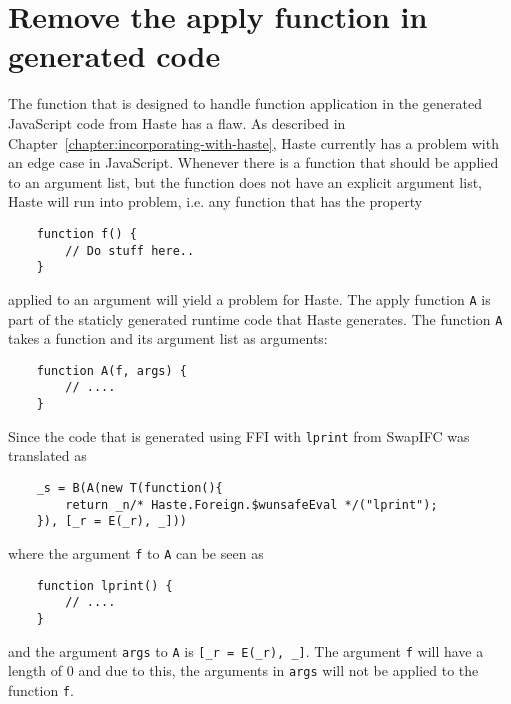 \section{Remove the apply function in generated code}
The function that is designed to handle function application in the generated JavaScript code from Haste has a flaw. As described in Chapter~\ref{chapter:incorporating-with-haste}, Haste currently has a problem with an edge case in JavaScript. Whenever there is a function that should be applied to an argument list, but the function does not have an explicit argument list, Haste will run into problem, i.e. any function that has the property
\begin{verbatim}
    function f() {
        // Do stuff here..
    }
\end{verbatim}
applied to an argument will yield a problem for Haste. The apply function {\tt A} is part of the staticly generated runtime code that Haste generates. The function {\tt A} takes a function and its argument list as arguments:
\begin{verbatim}
    function A(f, args) {
        // ....
    }
\end{verbatim}
Since the code that is generated using FFI with {\tt lprint} from SwapIFC  was translated as
\begin{verbatim}
    _s = B(A(new T(function(){
        return _n/* Haste.Foreign.$wunsafeEval */("lprint");
    }), [_r = E(_r), _]))
\end{verbatim}
where the argument {\tt f} to {\tt A} can be seen as
\begin{verbatim}
    function lprint() {
        // ....
    }
\end{verbatim}
and the argument {\tt args} to {\tt A} is {\tt [\_r = E(\_r), \_]}. The argument {\tt f} will have a length of 0 and due to this, the arguments in {\tt args} will not be applied to the function {\tt f}.

